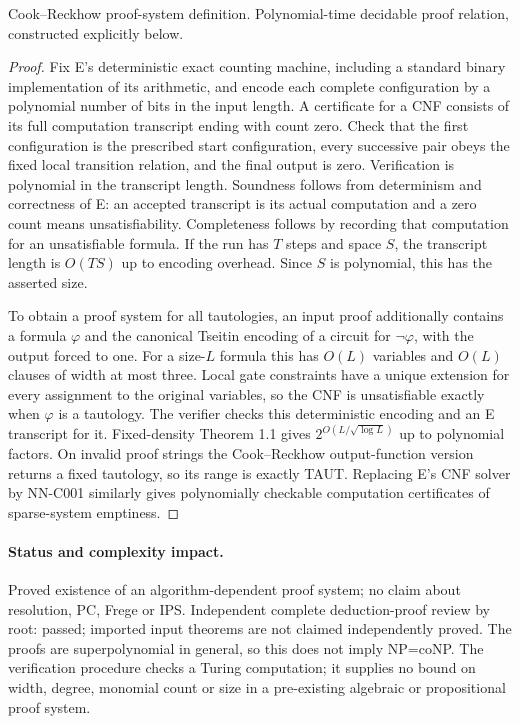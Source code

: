 Cook--Reckhow proof-system definition. Polynomial-time decidable proof relation, constructed explicitly below.

\begin{proof}
Fix E's deterministic exact counting machine, including a standard binary implementation of its arithmetic, and encode each complete configuration by a polynomial number of bits in the input length. A certificate for a CNF consists of its full computation transcript ending with count zero. Check that the first configuration is the prescribed start configuration, every successive pair obeys the fixed local transition relation, and the final output is zero. Verification is polynomial in the transcript length. Soundness follows from determinism and correctness of E: an accepted transcript is its actual computation and a zero count means unsatisfiability. Completeness follows by recording that computation for an unsatisfiable formula. If the run has $T$ steps and space $S$, the transcript length is $O(TS)$ up to encoding overhead. Since $S$ is polynomial, this has the asserted size.

To obtain a proof system for all tautologies, an input proof additionally contains a formula $\varphi$ and the canonical Tseitin encoding of a circuit for $\neg\varphi$, with the output forced to one. For a size-$L$ formula this has $O(L)$ variables and $O(L)$ clauses of width at most three. Local gate constraints have a unique extension for every assignment to the original variables, so the CNF is unsatisfiable exactly when $\varphi$ is a tautology. The verifier checks this deterministic encoding and an E transcript for it. Fixed-density Theorem 1.1 gives $2^{O(L/\sqrt{\log L})}$ up to polynomial factors. On invalid proof strings the Cook--Reckhow output-function version returns a fixed tautology, so its range is exactly TAUT. Replacing E's CNF solver by NN-C001 similarly gives polynomially checkable computation certificates of sparse-system emptiness.
\end{proof}
\paragraph{Status and complexity impact.}
Proved existence of an algorithm-dependent proof system; no claim about resolution, PC, Frege or IPS. Independent complete deduction-proof review by root: passed; imported input theorems are not claimed independently proved. The proofs are superpolynomial in general, so this does not imply NP=coNP. The verification procedure checks a Turing computation; it supplies no bound on width, degree, monomial count or size in a pre-existing algebraic or propositional proof system.

